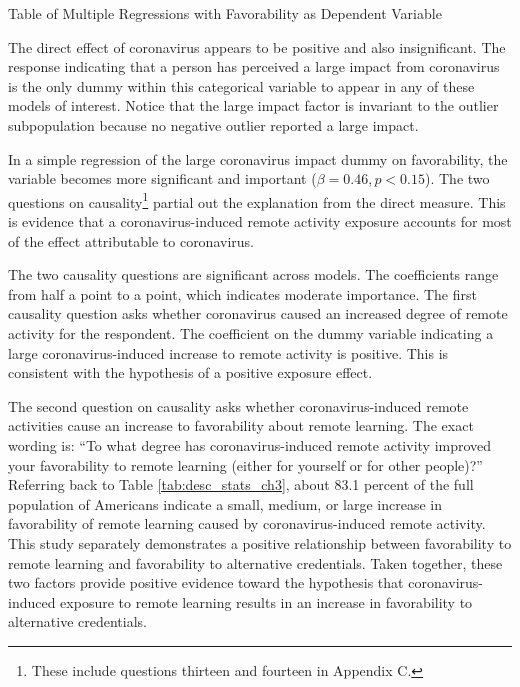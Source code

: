 \begin{table}
    \caption{Table of Multiple Regressions with Favorability as Dependent Variable}
    \resizebox{\columnwidth}{!}{
        
    }
    \tableSpace
    \label{tab:multiple_regs}
\end{table}

The direct effect of coronavirus appears to be positive and also insignificant.
The response indicating that a person has perceived a large impact from coronavirus is the only dummy
within this categorical variable to appear in any of these models of interest.
Notice that the large impact factor is invariant to the outlier subpopulation
because no negative outlier reported a large impact.

In a simple regression of the large coronavirus impact dummy on favorability,
the variable becomes more significant and important ($\beta = 0.46, p < 0.15$).
The two questions on causality\footnote{These include questions thirteen and fourteen in Appendix C.}
partial out the explanation from the direct measure.
This is evidence that a coronavirus-induced remote activity exposure accounts for most of the effect attributable to coronavirus.

The two causality questions are significant across models.
The coefficients range from half a point to a point, which indicates moderate importance.
The first causality question asks whether coronavirus caused an increased degree of remote activity for the respondent.
The coefficient on the dummy variable indicating a large coronavirus-induced increase to remote activity is positive.
This is consistent with the hypothesis of a positive exposure effect.

The second question on causality asks whether coronavirus-induced remote activities cause an increase
to favorability about remote learning.
The exact wording is:
``To what degree has coronavirus-induced remote activity improved your favorability to remote learning
(either for yourself or for other people)?''
Referring back to Table \ref{tab:desc_stats_ch3},
about 83.1 percent of the full population of Americans indicate a small,
medium, or large increase in favorability of remote learning
caused by coronavirus-induced remote activity.
This study separately demonstrates a positive relationship between favorability to remote learning
and favorability to alternative credentials.
Taken together,
these two factors provide positive evidence toward the hypothesis that coronavirus-induced exposure to remote learning
results in an increase in favorability to alternative credentials.

